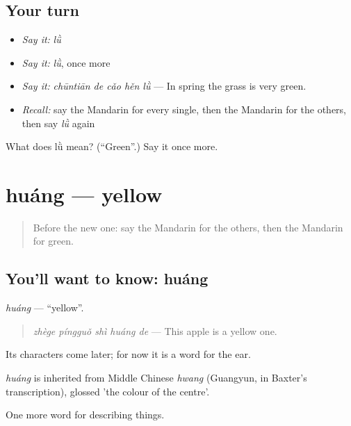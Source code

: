\subsection*{Your turn}
\begin{itemize}
\raggedright
  \item \emph{Say it:} \emph{lǜ}
  \item \emph{Say it:} \emph{lǜ}, once more
  \item \emph{Say it:} \emph{chūntiān de cǎo hěn lǜ} — In spring the grass is very green.
  \item \emph{Recall:} say the Mandarin for every single, then the Mandarin for the others, then say \emph{lǜ} again
\end{itemize}

\begin{tcolorbox}[breakable,colback=teal!4,colframe=teal!35!black,title={Before you move on}]
What does lǜ mean? (\textquotedblleft{}Green\textquotedblright{}.) Say it once more.
\end{tcolorbox}
\section[huáng]{huáng — yellow}

\label{lesson:ZH-C139-huang}



\begin{quote}
Before the new one: say the Mandarin for the others, then the Mandarin for green.
\end{quote}

\subsection*{You'll want to know: huáng}
\emph{huáng} — \textquotedblleft{}yellow\textquotedblright{}.

\begin{quote}
\emph{zhège píngguǒ shì huáng de} — This apple is a yellow one.
\end{quote}

Its characters come later; for now it is a word for the ear.

\begin{cousinweb}
\emph{huáng} is inherited from Middle Chinese \emph{hwang} (Guangyun, in Baxter's transcription), glossed 'the colour of the centre'.
\end{cousinweb}

\begin{grammarlens}[title={What you've built}]
One more word for describing things.
\end{grammarlens}

